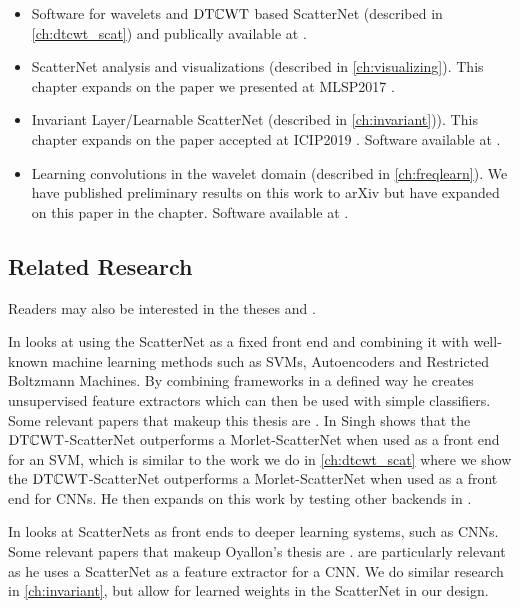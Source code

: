 \begin{itemize}
  \item Software for wavelets and $\mathrm{DT}\mathbb{C}\mathrm{WT}$ based ScatterNet (described in \autoref{ch:dtcwt_scat})
    and publically available at \cite{cotter_pytorch_2018}.
  \item ScatterNet analysis and visualizations (described in
    \autoref{ch:visualizing}). This chapter expands on the paper we presented at MLSP2017 
    \cite{cotter_visualizing_2017}.
  \item Invariant Layer/Learnable ScatterNet (described in \autoref{ch:invariant})). This chapter expands 
    on the paper accepted at ICIP2019 \cite{cotter_learnable_2019}. Software
    available at \cite{cotter_learnable_2019-1}.
  \item Learning convolutions in the wavelet domain (described in
    \autoref{ch:freqlearn}). We have published preliminary results on this work
    to arXiv \cite{cotter_deep_2018} but have expanded on this paper in the
    chapter. Software available at \cite{cotter_dtcwt_2018}.
\end{itemize}

\subsection{Related Research}
Readers may also be interested in the theses \cite{singh_scatternet_2018} and
\cite{oyallon_analyzing_2017}. 

In \cite{singh_scatternet_2018}
\citeauthor{singh_scatternet_2018} looks at using the ScatterNet as a fixed
front end and combining it with well-known machine learning methods such as
SVMs, Autoencoders and Restricted Boltzmann Machines. By combining frameworks in
a defined way he creates unsupervised feature extractors which can then be used
with simple classifiers. Some relevant papers that makeup this thesis are \cite{singh_multi-resolution_2016, 
singh_scatternet_2017, singh_generative_2018}. In
\cite{singh_multi-resolution_2016} Singh shows 
that the $\mathrm{DT}\mathbb{C}\mathrm{WT}$-ScatterNet outperforms a Morlet-ScatterNet when used as a front end for
an SVM, which is similar to the work we do in \autoref{ch:dtcwt_scat} where we
show the $\mathrm{DT}\mathbb{C}\mathrm{WT}$-ScatterNet outperforms a Morlet-ScatterNet when used as a
front end for CNNs. He then expands on this work by testing other backends in
\cite{singh_scatternet_2017, singh_generative_2018}. 

In \cite{oyallon_analyzing_2017}
\citeauthor{oyallon_analyzing_2017} looks at ScatterNets as front ends to
deeper learning systems, such as CNNs. Some relevant papers that makeup Oyallon's thesis are
\cite{oyallon_deep_2015, oyallon_scaling_2017, oyallon_hybrid_2017}. \cite{oyallon_scaling_2017, oyallon_hybrid_2017} 
are particularly relevant as he uses a ScatterNet as a feature extractor for a
CNN. We do similar research in \autoref{ch:invariant}, but allow for
learned weights in the ScatterNet in our design.
